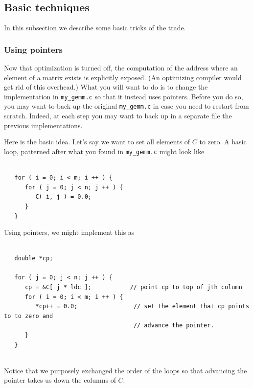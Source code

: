 

\subsection{Basic techniques}

In this subsection we describe some basic tricks of the trade.

\subsubsection{Using pointers}

Now that optimization is turned off, the computation of the address where an element of a matrix exists is explicitly exposed.  (An optimizing compiler would get rid of this overhead.)
What you will want to do is to change the implementation in {\tt my\_gemm.c} so that it instead uses pointers.
Before you do so, you may want to back up the original {\tt my\_gemm.c} in case you need to restart from scratch.  Indeed, at each step you may want to back up in a separate file the previous implementations.

Here is the basic idea.  Let's say we want to set 
all elements of $C $ to zero.  A basic loop, patterned after what you found in {\tt my\_gemm.c} might look like
\begin{verbatim}

   for ( i = 0; i < m; i ++ ) {                   
      for ( j = 0; j < n; j ++ ) {                
         C( i, j ) = 0.0;
      }                                           
   }                                              
\end{verbatim}
Using pointers, we might implement this as
\begin{verbatim}

   double *cp;

   for ( j = 0; j < n; j ++ ) {
      cp = &C[ j * ldc ];           // point cp to top of jth column      
      for ( i = 0; i < m; i ++ ) {                
         *cp++ = 0.0;                // set the element that cp points to to zero and 
                                     // advance the pointer.
      }                                      
   }                 
   
\end{verbatim}
Notice that we purposely exchanged the order of the loops so that advancing the pointer takes us down the columns of $ C $.

